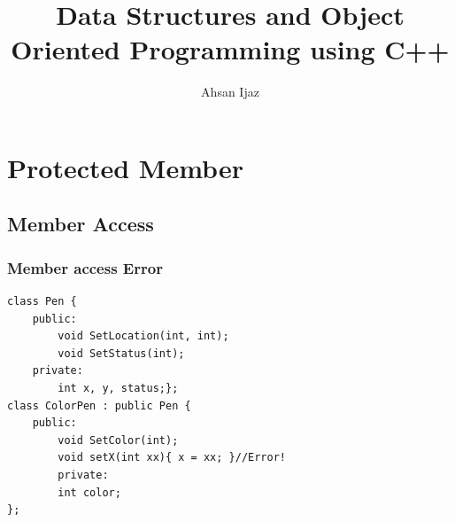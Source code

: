 \documentclass{beamer}
\newtheorem{Key points}{Key points}
\begin{document}
\title[Lecture 7]{Data Structures and Object Oriented Programming using C++} 
\author[]{Ahsan Ijaz}
\date{}
 \frame{\titlepage}

 \section{Protected Member}

 \subsection{Member Access}

 \begin{frame}[fragile]
\frametitle{Member access Error}
\begin{lstlisting}
class Pen {
	public:
		void SetLocation(int, int);
		void SetStatus(int);
	private:
		int x, y, status;};
class ColorPen : public Pen {
	public:
		void SetColor(int);
		void setX(int xx){ x = xx; }//Error! 	
        private:
		int color;
};
\end{lstlisting}
\end{frame}
\end{document}
